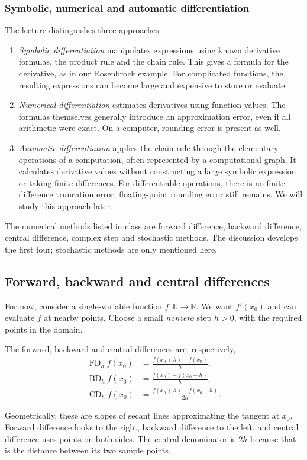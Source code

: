 \subsubsection*{Symbolic, numerical and automatic differentiation}
The lecture distinguishes three approaches.
\begin{enumerate}
 \item \emph{Symbolic differentiation} manipulates expressions using known derivative formulas, the product rule and the chain rule. This gives a formula for the derivative, as in our Rosenbrock example. For complicated functions, the resulting expressions can become large and expensive to store or evaluate.
 \item \emph{Numerical differentiation} estimates derivatives using function values. The formulas themselves generally introduce an approximation error, even if all arithmetic were exact. On a computer, rounding error is present as well.
 \item \emph{Automatic differentiation} applies the chain rule through the elementary operations of a computation, often represented by a computational graph. It calculates derivative values without constructing a large symbolic expression or taking finite differences. For differentiable operations, there is no finite-difference truncation error; floating-point rounding error still remains. We will study this approach later.
\end{enumerate}
The numerical methods listed in class are forward difference, backward difference, central difference, complex step and stochastic methods. The discussion develops the first four; stochastic methods are only mentioned here.

\subsection{Forward, backward and central differences}
For now, consider a single-variable function $f:\mathbb{R}\to\mathbb{R}$. We want $f'(x_0)$ and can evaluate $f$ at nearby points. Choose a small \emph{nonzero} step $h>0$, with the required points in the domain.
\begin{definition}
The forward, backward and central differences are, respectively,
\begin{align}
 \operatorname{FD}_h f(x_0)&=\frac{f(x_0+h)-f(x_0)}{h},
 \label{eq:lec07-fd}\\
 \operatorname{BD}_h f(x_0)&=\frac{f(x_0)-f(x_0-h)}{h},
 \label{eq:lec07-bd}\\
 \operatorname{CD}_h f(x_0)&=\frac{f(x_0+h)-f(x_0-h)}{2h}.
 \label{eq:lec07-cd}
\end{align}
\end{definition}
Geometrically, these are slopes of secant lines approximating the tangent at $x_0$. Forward difference looks to the right, backward difference to the left, and central difference uses points on both sides. The central denominator is $2h$ because that is the distance between its two sample points.


